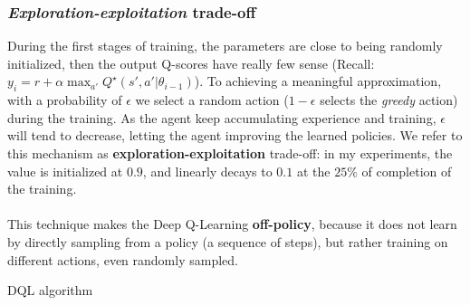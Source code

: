 \documentclass{beamer}
\begin{document}
\begin{frame}
\frametitle{\textit{Exploration-exploitation} trade-off}
 During the first stages of training, the parameters are close to being randomly initialized, then the output Q-scores have really few sense (Recall: $y_i =  r + \alpha \max_{a'} Q^\star(s', a'|\theta_{i-1})$). To achieving a meaningful approximation, with a probability of $\epsilon$ we select a random action ($1 - \epsilon$ selects the \textit{greedy} action) during the training. As the agent keep accumulating experience and training, $\epsilon$ will tend to decrease, letting the agent improving the learned policies. We refer to this mechanism as \textbf{exploration-exploitation} trade-off: in my\label{our} experiments, the value is initialized at $0.9$, and linearly decays to $0.1$ at the $25\%$ of completion of the training.\\~\\
 This technique makes the Deep Q-Learning \textbf{off-policy}, because it does not learn by directly sampling from a policy (a sequence of steps), but rather training on different actions, even randomly sampled.
\end{frame}

\begin{frame}{DQL algorithm}
	\begin{center}
	\end{center}
\end{frame}
\end{document}
